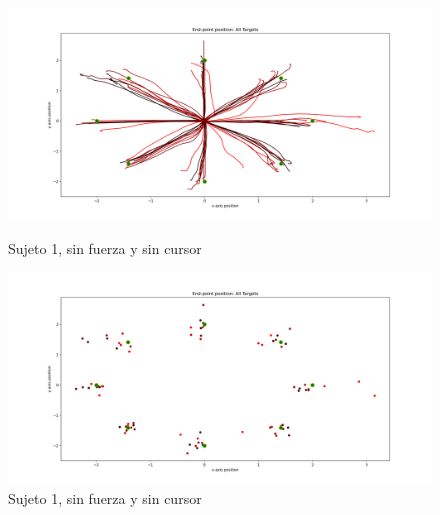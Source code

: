 \documentclass[a4paper,11pt, oneside]{book}
\begin{document}
\begin{figure}[H]
	\begin{minipage}[b]{0.5\linewidth}
		\centering
		\includegraphics[width=\linewidth]{sujeto1/no_force_no_cursor/trayectorias}
		\caption{Sujeto 1, sin fuerza y sin cursor}
		\label{1-fase3-1}
	\end{minipage}
	\hspace{0.5cm}
	\begin{minipage}[b]{0.5\linewidth}
		\centering
		\includegraphics[width=\linewidth]{sujeto1/no_force_no_cursor/trayectorias_puntos}
		\caption{Sujeto 1, sin fuerza y sin cursor}
		\label{1-fase3-2}
	\end{minipage}
\end{figure}
\end{document}
